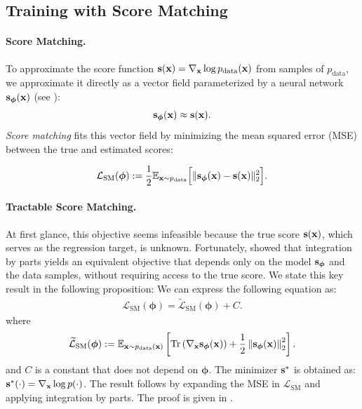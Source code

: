 \subsection{Training with Score Matching}\label{subsec:training-sm}
\paragraph{Score Matching.}
To approximate the score function ${\mathbf{s}}({\mathbf{x}}) = \nabla_{{\mathbf{x}}} \log p_{\mathrm{data}}({\mathbf{x}})$ from samples of $p_{\mathrm{data}}$,  
we approximate it directly as a vector field parameterized by a neural network ${\mathbf{s}}_{\bm{\phi}}({\mathbf{x}})$ (see ):
\[
{\mathbf{s}}_{\bm{\phi}}({\mathbf{x}}) \approx {\mathbf{s}}({\mathbf{x}}).
\]
\emph{Score matching} fits this vector field by minimizing the mean squared error (MSE) between the true and estimated scores:
\begin{mdframed}
\begin{align}\label{eq:sm}
    \mathcal{L}_{\mathrm{SM}}(\bm{\phi}) 
    := \frac{1}{2}  \mathbb{E}_{{\mathbf{x}} \sim p_{\mathrm{data}}}
    \Big[\| {\mathbf{s}}_{\bm{\phi}}({\mathbf{x}}) - {\mathbf{s}}({\mathbf{x}})\|_2^2\Big].
\end{align}
\end{mdframed}

\paragraph{Tractable Score Matching.}
At first glance, this objective seems infeasible because the true score ${\mathbf{s}}({\mathbf{x}})$, which serves as the regression target, is unknown.  
Fortunately, \citet{hyvarinen2005estimation} showed that integration by parts yields an equivalent objective that depends only on the model ${\mathbf{s}}_{\bm{\phi}}$ and the data samples, without requiring access to the true score.  
We state this key result in the following proposition: 
        {
        We can express the following equation as:
        \begin{align*}
            \mathcal{L}_{\text{SM}}(\bm{\phi}) = \widetilde{\mathcal{L}}_{\text{SM}}(\bm{\phi}) + C.
        \end{align*}
        where
        \begin{align}\label{eq:sm-alternative}
            \widetilde{\mathcal{L}}_{\text{SM}}(\bm{\phi})
            := \mathbb{E}_{{\mathbf{x}} \sim p_{\text{data}}({\mathbf{x}})} \left[
            \operatorname{Tr}\left(\nabla_{{\mathbf{x}}}{\mathbf{s}}_{\bm{\phi}}({\mathbf{x}})\right)
            + \frac{1}{2} \left\lVert{\mathbf{s}}_{\bm{\phi}}({\mathbf{x}})\right\rVert_2^2
            \right].
        \end{align}
        and $C$ is a constant that does not depend on $\bm{\phi}$. The minimizer ${\mathbf{s}}^*$ is obtained as: ${\mathbf{s}}^*(\cdot) = \nabla_{{\mathbf{x}}} \log p(\cdot)$.
        }
        {The result follows by expanding the MSE in $ \mathcal{L}_{\text{SM}} $ and applying integration by parts. The proof is given in . 
        }

